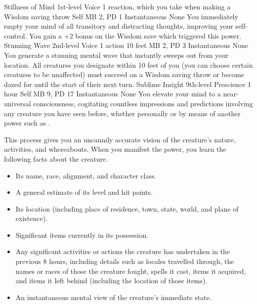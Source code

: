\DndPowerHeader%
    {Stillness of Mind\label{pwr:stillness_of_mind}}
    {1st-level Voice}
    {1 reaction, which you take when making a Wisdom saving throw}
    {Self}
    {MB 2, PD 1}
    {Instantaneous}
    {None}
You immediately empty your mind of all transitory
and distracting thoughts, improving your self-control. You
gain a +2 bonus on the Wisdom save which triggered this power.
\DndPowerHeader%
    {Stunning Wave\label{pwr:stunning_wave}}
    {2nd-level Voice}
    {1 action}
    {10 feet}
    {MB 2, PD 3}
    {Instantaneous}
    {None}
You generate a stunning mental wave that
instantly sweeps out from your location. All creatures you
designate within 10 feet of you (you can choose certain creatures
to be unaffected) must succeed on a Wisdom saving throw or
become dazed for until the start of their next turn.
\DndPowerHeader%
    {Sublime Insight\label{pwr:sublime_insight}}
    {9th-level Prescience}
    {1 hour}
    {Self}
    {MB 9, PD 17}
    {Instantaneous}
    {None}
You elevate your mind to a
near-universal consciousness,
cogitating countless impressions and predictions
involving any creature you have seen before,
whether personally or by means of another power
such as .

This process gives you an uncannily accurate vision
of the creature's nature,
activities,
and whereabouts.
When you manifest the power,
you learn the following facts about the creature.
\begin{itemize}
  \item Its name, race, alignment, and character class.
  \item A general estimate of its level and hit points.
  \item Its location (including place of residence, town,
        state, world, and plane of existence).
  \item Significant items currently in its possession.
  \item Any significant activities or actions the creature
        has undertaken in the previous 8 hours,
        including details such as locales travelled through,
        the names or races of those the creature fought,
        spells it cast,
        items it acquired,
        and items it left behind
        (including the location of those items).
  \item An instantaneous mental view of the creature's
        immediate state.
\end{itemize}


